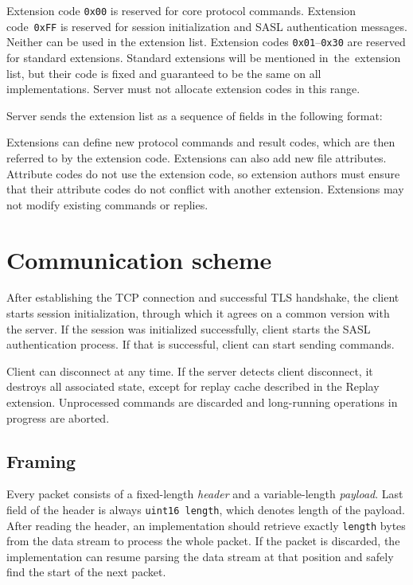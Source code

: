 Extension code {\tt 0x00} is reserved for core protocol commands. Extension code~{\tt 0xFF} is reserved for
session initialization and SASL authentication messages. Neither can be used in the extension list.
Extension codes {\tt 0x01}--{\tt 0x30} are reserved for standard extensions. Standard extensions will be
mentioned in~the~extension list, but their code is fixed and guaranteed to be the same on all implementations.
Server must not allocate extension codes in this range.

Server sends the extension list as a sequence of fields in the following format:
\beginpk
\endpk

Extensions can define new protocol commands and result codes, which are then referred to by the extension
code. Extensions can also add new file attributes. Attribute codes do not use the extension code, so extension
authors must ensure that their attribute codes do not conflict with another extension. Extensions may not modify
existing commands or replies.


\section{Communication scheme}

After establishing the TCP connection and successful TLS handshake, the client starts session initialization,
through which it agrees on a common version with the server. If the session was initialized successfully,
client starts the SASL authentication process. If that is successful, client can start sending commands.

Client can disconnect at any time. If the server detects client disconnect, it destroys all associated state,
except for replay cache described in the Replay extension. Unprocessed commands are discarded and long-running
operations in progress are aborted.

%

\subsection{Framing}

Every packet consists of a fixed-length {\it header} and a variable-length {\it payload}. Last field of the
header is always {\tt uint16 length}, which denotes length of the payload. After reading the header, an
implementation should retrieve exactly {\tt length} bytes from the data stream to process the whole packet. If
the packet is discarded, the implementation can resume parsing the data stream at that position and safely
find the start of the next packet.

